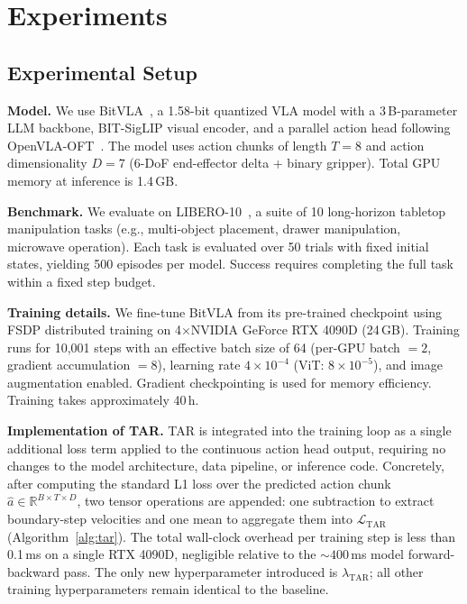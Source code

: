 \section{Experiments}
\label{sec:experiments}

\subsection{Experimental Setup}
\textbf{Model.} We use BitVLA~\cite{wang2025bitvla}, a 1.58-bit quantized VLA model with a 3\,B-parameter LLM backbone, BIT-SigLIP visual encoder, and a parallel action head following OpenVLA-OFT~\cite{kim2025openvlaoft}. The model uses action chunks of length $T=8$ and action dimensionality $D=7$ (6-DoF end-effector delta + binary gripper). Total GPU memory at inference is 1.4\,GB.

\textbf{Benchmark.} We evaluate on LIBERO-10~\cite{liu2023libero}, a suite of 10 long-horizon tabletop manipulation tasks (e.g., multi-object placement, drawer manipulation, microwave operation). Each task is evaluated over 50 trials with fixed initial states, yielding 500 episodes per model. Success requires completing the full task within a fixed step budget.

\textbf{Training details.} We fine-tune BitVLA from its pre-trained checkpoint using FSDP distributed training on 4$\times$NVIDIA GeForce RTX 4090D (24\,GB). Training runs for 10,001 steps with an effective batch size of 64 (per-GPU batch $=2$, gradient accumulation $=8$), learning rate $4 \times 10^{-4}$ (ViT: $8 \times 10^{-5}$), and image augmentation enabled. Gradient checkpointing is used for memory efficiency. Training takes approximately 40\,h.

\textbf{Implementation of TAR.} TAR is integrated into the training loop as a single additional loss term applied to the continuous action head output, requiring no changes to the model architecture, data pipeline, or inference code. Concretely, after computing the standard L1 loss over the predicted action chunk $\hat{a} \in \mathbb{R}^{B \times T \times D}$, two tensor operations are appended: one subtraction to extract boundary-step velocities and one mean to aggregate them into $\mathcal{L}_{\text{TAR}}$ (Algorithm~\ref{alg:tar}). The total wall-clock overhead per training step is less than 0.1\,ms on a single RTX 4090D, negligible relative to the ${\sim}400$\,ms model forward-backward pass. The only new hyperparameter introduced is $\lambda_{\text{TAR}}$; all other training hyperparameters remain identical to the baseline.

